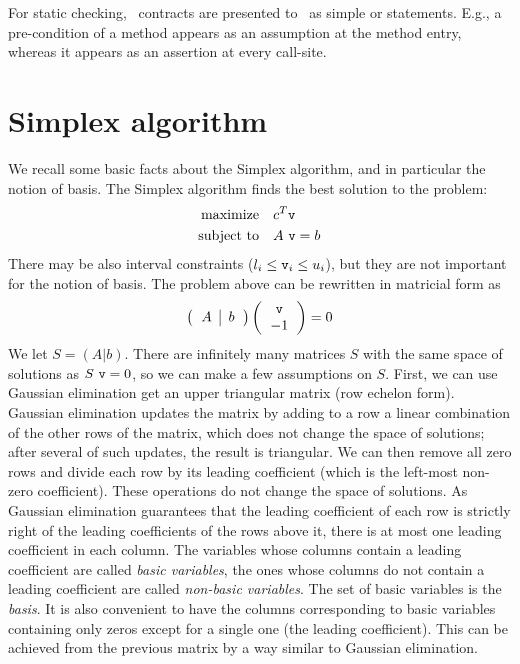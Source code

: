 \documentclass[sttt]{svjour}
\begin{document}
For static checking, \Foxtrot\ contracts are presented
to \Clousot\ as simple  or 
statements. E.g., a pre-condition of a method appears as an assumption
at the method entry, whereas it appears as an assertion at every
call-site.

\section{Simplex algorithm}
\label{sec:simplex}

We recall some basic facts about the Simplex algorithm, and in particular the notion of basis.
The Simplex algorithm finds the best solution to the problem:
\[
\begin{aligned}
\text{maximize}  &\quad c^T \mathtt{v} \\
\text{subject to}  &\quad A\ \mathtt{v} = b 
\end{aligned}
\]
There may  be also  interval constraints  ($l_i \leq \mathtt{v}_i \leq u_i$), but they are not important for the notion of basis.
The problem above can be rewritten in matricial form as
\[
\left( \begin{tabular}{c|c}
 $A$ & $b$
\end{tabular}
 \right)
\left( \begin{tabular}{c}
 \code{v} \\ $-1$
\end{tabular}
 \right) = 0
\]
We let $S = ( A | b)$. 
There are infinitely many   matrices $S$ with the same space of solutions as $S\ \code{v} = 0$, so we can make a few assumptions on $S$.
First, we can use Gaussian elimination get an upper triangular matrix (row echelon form). 
Gaussian elimination updates the matrix by adding to a row a linear combination of the other rows of the matrix, which does not change the space of solutions; after several of such updates, the result is triangular. 
We can then remove all zero rows and divide each row by its leading coefficient (which is the left-most non-zero coefficient). These operations do not change the space of solutions. 
As Gaussian elimination guarantees that the leading coefficient of each row is strictly right of the leading coefficients of the rows above it, there is at most one leading coefficient in each column. 
The variables whose columns contain a leading coefficient are called \emph{basic variables}, the ones whose columns do not contain a leading coefficient are called \emph{non-basic variables}. 
The set of basic variables is  the \emph{basis}.
It is also  convenient to have the columns corresponding to basic variables containing only zeros except for a single one (the leading coefficient).
This can be achieved from the previous matrix by a way similar to Gaussian elimination.
\end{document}
